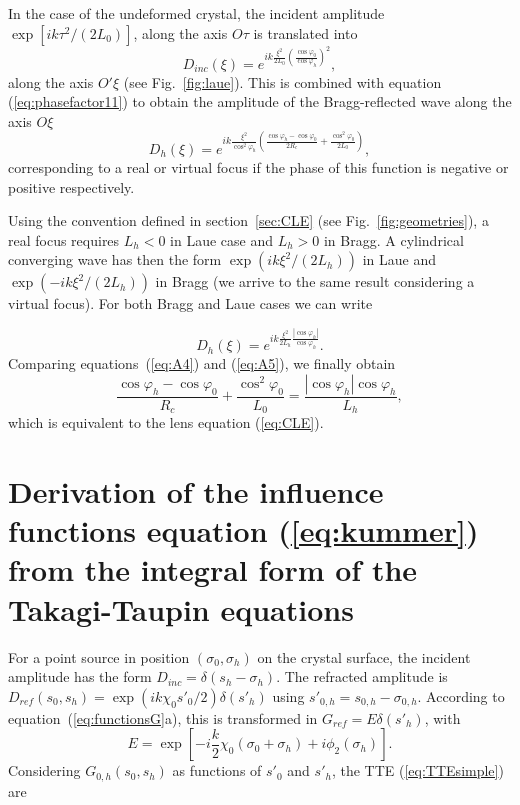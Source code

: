 \documentclass[preprint]{iucr}              %
\newcommand{\inred}[1]{{\color{red}#1}}
\begin{document}
\inred{In the case of the undeformed crystal, the incident \inred{amplitude} $\exp[i k \tau^2 / (2L_0)]$, \inred{along the axis} $O\tau$ 
is translated into 
\begin{equation}
    D_{inc}(\xi) = e^{i k \frac{\xi^2}{2L_0}\left(\frac{\cos\varphi_0}{\cos\varphi_h}\right)^2},
\end{equation}
along the axis $O'\xi$ (see Fig.~\ref{fig:laue}).
This is combined with equation (\ref{eq:phasefactor11}) to obtain} the amplitude of the Bragg-reflected wave along the axis $O\xi$
\begin{equation}
\label{eq:A4}
    D_h(\xi) = e^{i k
    \frac{\xi^2}{\cos^2\varphi_h}\left(\frac{\cos\varphi_h-\cos\varphi_0}{2R_c} + \frac{\cos^2\varphi_0}{2L_0}\right)},
\end{equation}
corresponding to a real or virtual focus if the phase of this function is negative or positive respectively. 

\inred{Using the convention defined in section~\ref{sec:CLE} (see Fig.~\ref{fig:geometries}), a real focus requires $L_h<0$ in Laue case and $L_h>0$ in Bragg. A cylindrical converging wave has then the form $\exp(i k \xi^2 / (2L_h))$ in Laue and $\exp(-i k \xi^2 / (2L_h))$ in Bragg (we arrive to the same result considering a virtual focus). For both Bragg and Laue cases we can write}

\begin{equation}
\label{eq:A5}
D_h(\xi) = e^{i k \frac{\xi^2}{2 L_h}\frac{|\cos\varphi_h|}{\cos\varphi_h}}.   
\end{equation}
 Comparing equations~(\ref{eq:A4}) and (\ref{eq:A5}), we finally obtain
\begin{equation}
    \frac{\cos\varphi_h-\cos\varphi_0}{R_c}+
    \frac{\cos^2\varphi_0}{L_0}=\frac{|\cos\varphi_h|\cos\varphi_h}{L_h},
\end{equation}
which is equivalent to the lens equation (\ref{eq:CLE}).

\section{Derivation of the influence functions \inred{equation (\ref{eq:kummer})} from the integral form of the Takagi-Taupin equations}
\label{appendix:TTEintegral}

\inred{For a point source in position $(\sigma_0,\sigma_h)$ on the crystal surface, the incident amplitude has the form $D_{inc}= \delta(s_h-\sigma_h)$.}
The refracted amplitude is $D_{ref}(s_0,s_h)=\exp(i k \chi_0 s'_0/2)\delta(s'_h)$ \inred{using} $s'_{0,h}=s_{0,h}-\sigma_{0,h}$.
According to equation~(\ref{eq:functionsG}\inred{a}), \inred{this is transformed in $G_{ref}=E \delta(s'_h)$, with}
\begin{equation}
\label{eq:appE}
    E =\exp[-i\frac{k}{2}\chi_0(\sigma_0+\sigma_h)+i \phi_2(\sigma_h)].
\end{equation}
Considering $G_{0,h}(s_0,s_h)$  as functions of $s'_0$ and $s'_h$, the TTE (\ref{eq:TTEsimple}) are
\end{document}
